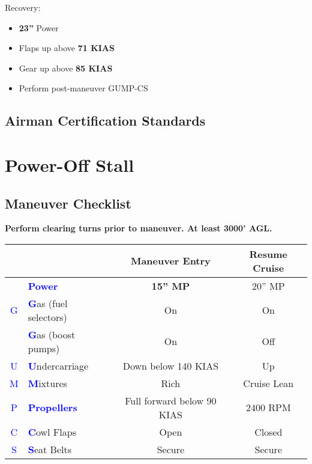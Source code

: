 {Recovery:
\begin{itemize}[label={}]
\item \textbf{23''} Power
\item Flaps up above \textbf{71 KIAS}
\item Gear up above \textbf{85 KIAS}
\item Perform post-maneuver GUMP-CS
\end{itemize}


\subsection{Airman Certification Standards}
\newpage

\section{Power-Off Stall}
\subsection{Maneuver Checklist}

\textbf{Perform clearing turns prior to maneuver. At least 3000' AGL.}

\begin{table}[H]
\centering
\begin{tabular}{|c|l|c|c|}
\hline
                    &                                                 & \textbf{Maneuver Entry} & \textbf{Resume Cruise} \\ \hline
                    & \textcolor{blue}{\textbf{Power}}                & \textbf{15'' MP}        & 20'' MP                \\ \hline
\textcolor{blue}{G} & \textcolor{blue}{\textbf{G}}as (fuel selectors) & On                      & On                     \\
                    & \textcolor{blue}{\textbf{G}}as (boost pumps)    & On                      & Off                    \\ \hline
\textcolor{blue}{U} & \textcolor{blue}{\textbf{U}}ndercarriage        & Down below 140 KIAS     & Up                     \\ \hline
\textcolor{blue}{M} & \textcolor{blue}{\textbf{M}}ixtures             & Rich                    & Cruise Lean            \\ \hline
\textcolor{blue}{P} & \textcolor{blue}{\textbf{Propellers}}           & Full forward below 90 KIAS & 2400 RPM            \\ \hline
\textcolor{blue}{C} & \textcolor{blue}{\textbf{C}}owl Flaps           & Open                    & Closed                 \\ \hline
\textcolor{blue}{S} & \textcolor{blue}{\textbf{S}}eat Belts           & Secure                  & Secure                 \\ \hline
\end{tabular}
\end{table}

}
